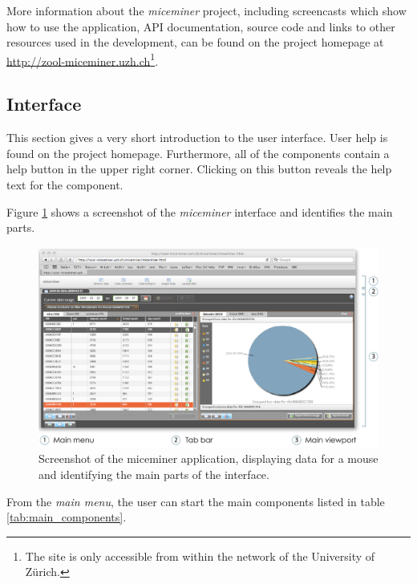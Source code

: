 More information about the \textit{miceminer} project, including screencasts which show how to use the application, \ac{API} documentation, source code and links to other resources used in the development, can be found on the project homepage at \href{http://zool-miceminer.uzh.ch/}{http://zool-miceminer.uzh.ch}\footnote{The site is only accessible from within the network of the University of Z\"urich.}. 

\subsection{Interface}
\label{subsec:miceminer_interface}

This section gives a very short introduction to the user interface. User help is found on the project homepage. Furthermore, all of the components contain a help button in the upper right corner. Clicking on this button reveals the help text for the component.

Figure \ref{fig:interface_overview} shows a screenshot of the \textit{miceminer} interface and identifies the main parts.

\begin{figure}[!ht]
\begin{center}
  \includegraphics[width=\textwidth]{assets/pdf/interface_overview.pdf}
  \caption[miceminer interface overview]{Screenshot of the miceminer application, displaying data for a mouse and identifying the main parts of the interface.}
  \label{fig:interface_overview}
\end{center}
\end{figure}

From the \textit{main menu}, the user can start the main components listed in table \ref{tab:main_components}. 


